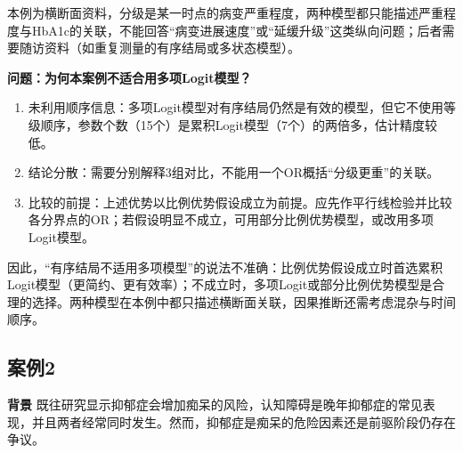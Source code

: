 本例为横断面资料，分级是某一时点的病变严重程度，两种模型都只能描述严重程度与HbA1c的关联，不能回答“病变进展速度”或“延缓升级”这类纵向问题；后者需要随访资料（如重复测量的有序结局或多状态模型）。

\textbf{问题：为何本案例不适合用多项Logit模型？}
\begin{enumerate}
\item 未利用顺序信息：多项Logit模型对有序结局仍然是有效的模型，但它不使用等级顺序，参数个数（15个）是累积Logit模型（7个）的两倍多，估计精度较低。
\item 结论分散：需要分别解释3组对比，不能用一个OR概括“分级更重”的关联。
\item 比较的前提：上述优势以比例优势假设成立为前提。应先作平行线检验并比较各分界点的OR；若假设明显不成立，可用部分比例优势模型，或改用多项Logit模型。
\end{enumerate}
因此，“有序结局不适用多项模型”的说法不准确：比例优势假设成立时首选累积Logit模型（更简约、更有效率）；不成立时，多项Logit或部分比例优势模型是合理的选择。两种模型在本例中都只描述横断面关联，因果推断还需考虑混杂与时间顺序。
\subsection{案例2}
\textbf{背景} 既往研究显示抑郁症会增加痴呆的风险，认知障碍是晚年抑郁症的常见表现，并且两者经常同时发生。然而，抑郁症是痴呆的危险因素还是前驱阶段仍存在争议。

